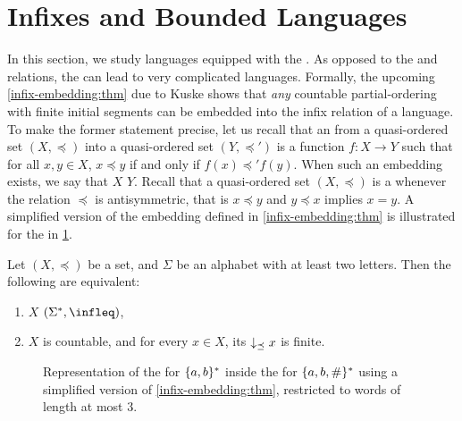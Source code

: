 \section{Infixes and Bounded Languages}
\label{infixes-regular:sec}

\AP In this section, we study languages equipped with the .
As opposed to the  and  relations, the  can lead to very complicated  languages.
Formally, the upcoming \cref{infix-embedding:thm} due to Kuske shows that
\emph{any} countable partial-ordering with finite initial segments can be
embedded into the infix relation of a language. To make the former statement
precise, let us recall that an  from a quasi-ordered set
$(X, \preceq)$ into a quasi-ordered set $(Y, \preceq')$ is a function $f \colon
X \to Y$ such that for all $x, y \in X$, $x \preceq y$ if and only if $f(x)
\preceq' f(y)$. When such an embedding exists, we say that $X$  $Y$. Recall that a quasi-ordered set $(X, \preceq)$ is a  whenever the relation $\preceq$ is antisymmetric, that is $x \preceq
y$ and $y \preceq x$ implies $x = y$. 
A simplified version of the embedding defined in \cref{infix-embedding:thm} is illustrated
for the  in \cref{infix-embedding:fig}.
\begin{lemma}{\cite[Lemma 5.1]{DBLP:journals/ita/Kuske06}}
    \label{infix-embedding:thm}
    Let $(X, \preceq)$ be a  set,
    and $\Sigma$ be an alphabet with at least two letters.
    Then the following are equivalent:
    \begin{enumerate}
        \item 
            $X$  $(\Sigma^*, \infleq)$,
        \item 
            $X$ is countable, and for every $x \in X$,
            its 
            $\dwset[\preceq]{x}$ is finite.
    \end{enumerate}
\end{lemma}
\begin{figure}
    \centering
    
    \caption{Representation of the  for $\{ a,b \}^*$
        inside the  for $\{ a,b,\# \}^*$
        using a simplified version of \cref{infix-embedding:thm}, restricted to words
        of length at most $3$. 
    }
    \label{infix-embedding:fig}
\end{figure}

